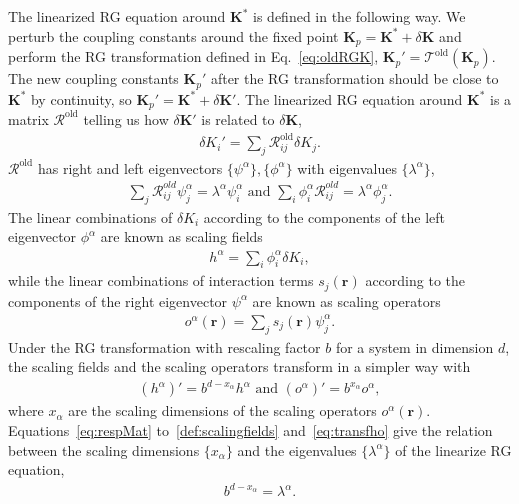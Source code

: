 \documentclass[aps,prr,reprint,superscriptaddress,floatfix]{revtex4-2}
\begin{document}
The linearized RG equation around $\mathbf{K}^{*}$ is defined in the following way.
We perturb the coupling constants around the fixed point $\mathbf{K}_p = \mathbf{K}^{*} + \delta \mathbf{K}$ and perform the RG transformation defined in Eq.~\eqref{eq:oldRGK}, $\mathbf{K}_p' = \mathcal{T}^{\text{old}}\left(\mathbf{K}_p\right)$. 
The new coupling constants $\mathbf{K}_p'$ after the RG transformation should be close to $\mathbf{K}^{*}$ by continuity, so $\mathbf{K}_p' = \mathbf{K}^{*} + \delta \mathbf{K}'$.
The linearized RG equation around $\mathbf{K}^{*}$ is a matrix $\mathcal{R}^{\text{old}}$ telling us how $\delta \mathbf{K}'$ is related to $\delta \mathbf{K}$,
%
\begin{align}\label{eq:respMat}
    \delta K_i' = \sum_j\mathcal{R}^{\text{old}}_{ij} \delta K_j.
\end{align}
%
$\mathcal{R}^{\text{old}}$ has right and left eigenvectors $\{\psi^{\alpha}\}, \{\phi^{\alpha}\}$ with eigenvalues $\{\lambda^{\alpha}\}$,
%
\begin{align}\label{eq:eigsofRespM}
    \sum_j \mathcal{R}^{old}_{ij} \psi^{\alpha}_j = \lambda^{\alpha}
    \psi^{\alpha}_i \text{ and } \sum_i \phi^{\alpha}_i
    \mathcal{R}^{old}_{ij} = \lambda^{\alpha} \phi^{\alpha}_j.
\end{align}
%
The linear combinations of $\delta K_i$ according to the components of the left eigenvector $\phi^{\alpha}$ are known as scaling fields
%
\begin{align}\label{def:scalingfields}
    h^{\alpha} = \sum_i \phi^{\alpha}_i \delta K_i,
\end{align}
%
while the linear combinations of interaction terms $s_j(\mathbf{r})$ according to the components of the right eigenvector $\psi^{\alpha}$ are known as scaling operators
%
\begin{align}\label{def:scalingOpt}
    o^{\alpha}(\mathbf{r}) = \sum_j s_j(\mathbf{r}) \psi^{\alpha}_j.
\end{align}
%
Under the RG transformation with rescaling factor $b$ for a system in dimension $d$, the scaling fields and the scaling operators transform in a simpler way with 
%
\begin{align}\label{eq:transfho}
    \left(h^{\alpha} \right)' = b^{d - x_{\alpha}} h^{\alpha} \text{ and }
    \left(o^{\alpha}\right)' = b^{x_{\alpha}} o^{\alpha},
\end{align}
where $x_{\alpha}$ are the scaling dimensions of the scaling operators $o^{\alpha}(\mathbf{r})$. 
Equations~\eqref{eq:respMat} to~\eqref{def:scalingfields} and~\eqref{eq:transfho} give the relation between the scaling dimensions $\{x_{\alpha}\}$ and the eigenvalues $\{\lambda^{\alpha}\}$ of the linearize RG equation, 
%
\begin{align}\label{eq:lambda2x}
    b^{d-x_{\alpha}} = \lambda^{\alpha}.
\end{align}
%
\end{document}
